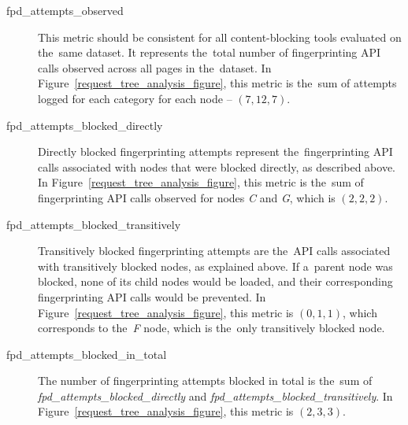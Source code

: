 \begin{description}
\item[fpd\_attempts\_observed]
This metric should be consistent for all content-blocking tools evaluated on the~same dataset. It represents the~total number of fingerprinting API calls observed across all pages in the~dataset. In  Figure~\ref{request_tree_analysis_figure}, this metric is the~sum of attempts logged for each category for each node -- $(7, 12, 7)$.

\item[fpd\_attempts\_blocked\_directly]
Directly blocked fingerprinting attempts represent the~fingerprinting API calls associated with nodes that were blocked directly, as described above. In Figure~\ref{request_tree_analysis_figure}, this metric is the~sum of fingerprinting API calls observed for nodes \emph{C} and \emph{G}, which is $(2, 2, 2)$.

\item[fpd\_attempts\_blocked\_transitively]
Transitively blocked fingerprinting attempts are the~API calls associated with transitively blocked nodes, as explained above. If a~parent node was blocked, none of its child nodes would be loaded, and their corresponding fingerprinting API calls would be prevented. In Figure~\ref{request_tree_analysis_figure}, this metric is $(0, 1, 1)$, which corresponds to the~\emph{F} node, which is the~only transitively blocked node.

\item[fpd\_attempts\_blocked\_in\_total]
The number of fingerprinting attempts blocked in total is the~sum of \textit{fpd\_attempts\_blocked\_directly} and \textit{fpd\_attempts\_blocked{\linebreak}\_transitively}. In Figure~\ref{request_tree_analysis_figure}, this metric is $(2, 3, 3)$.
\end{description}
